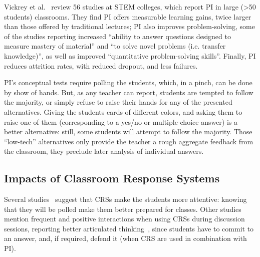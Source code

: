 Vickrey et al.~\cite{vickrey2015PI} review 56 studies at STEM colleges, which report PI in large (\textgreater50 students) classrooms. They find PI offers measurable learning gains, twice larger than those offered by traditional lectures; PI also improves problem-solving, some of the studies reporting increased “ability to answer questions designed to measure mastery of material” and “to solve novel problems (i.e. transfer knowledge)”, as well as improved “quantitative problem-solving skills”. Finally, PI reduces attrition rates, with reduced dropout, and less failures.

PI's conceptual tests require polling the students, which, in a pinch, can be done by show of hands. But, as any teacher can report, students are tempted to follow the majority, or simply refuse to raise their hands for any of the presented alternatives. Giving the students cards of different colors, and asking them to raise one of them (corresponding to a yes/no or multiple-choice answer) is a better alternative: still, some students will attempt to follow the majority. Those “low-tech” alternatives only provide the teacher a rough aggregate feedback from the classroom, they preclude later analysis of individual answers.




\subsection{Impacts of Classroom Response Systems}

Several studies~\cite{yourstone2008classroom, caldwell2007clickers} suggest that CRSs make the students more attentive: knowing that they will be polled make them better prepared for classes. %
Other studies~\cite{kay2009examining, caldwell2007clickers} mention frequent and positive interactions  when using CRSs during discussion sessions, reporting better articulated thinking~\cite{beatty2005transforming}, since students have to commit to an answer, and, if required, defend it (when CRS are used in combination with PI).

